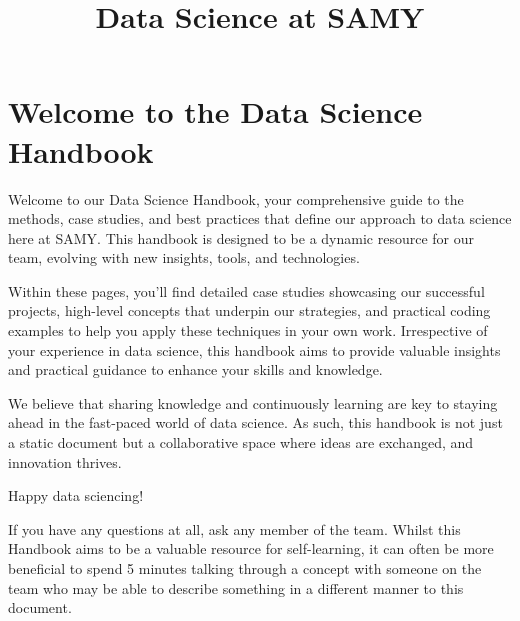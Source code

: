 \documentclass[
  letterpaper,
  DIV=11,
  numbers=noendperiod]{scrreprt}
\title{Data Science at SAMY}
\author{}
\date{}
\renewcommand*\contentsname{Table of contents}
\newcommand\contentsname{Table of contents}
\begin{document}
\maketitle

\renewcommand*\contentsname{Table of contents}
{
\hypersetup{linkcolor=}
\setcounter{tocdepth}{2}
\tableofcontents
}

\chapter{Welcome to the Data Science
Handbook}\label{welcome-to-the-data-science-handbook}

Welcome to our Data Science Handbook, your comprehensive guide to the
methods, case studies, and best practices that define our approach to
data science here at SAMY. This handbook is designed to be a dynamic
resource for our team, evolving with new insights, tools, and
technologies.

Within these pages, you'll find detailed case studies showcasing our
successful projects, high-level concepts that underpin our strategies,
and practical coding examples to help you apply these techniques in your
own work. Irrespective of your experience in data science, this handbook
aims to provide valuable insights and practical guidance to enhance your
skills and knowledge.

We believe that sharing knowledge and continuously learning are key to
staying ahead in the fast-paced world of data science. As such, this
handbook is not just a static document but a collaborative space where
ideas are exchanged, and innovation thrives.

Happy data sciencing!

\begin{tcolorbox}[enhanced jigsaw, opacitybacktitle=0.6, breakable, title=\textcolor{quarto-callout-note-color}{\faInfo}\hspace{0.5em}{Note}, arc=.35mm, colframe=quarto-callout-note-color-frame, colbacktitle=quarto-callout-note-color!10!white, left=2mm, bottomrule=.15mm, opacityback=0, toprule=.15mm, bottomtitle=1mm, toptitle=1mm, titlerule=0mm, leftrule=.75mm, colback=white, rightrule=.15mm, coltitle=black]

If you have any questions at all, ask any member of the team. Whilst
this Handbook aims to be a valuable resource for self-learning, it can
often be more beneficial to spend 5 minutes talking through a concept
with someone on the team who may be able to describe something in a
different manner to this document.

\end{tcolorbox}
\end{document}
